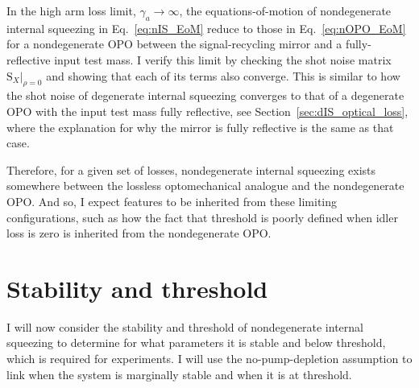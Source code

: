 
In the high arm loss limit, $\gamma_a\rightarrow\infty$, the equations-of-motion of nondegenerate internal squeezing in Eq.~\ref{eq:nIS_EoM} reduce to those in Eq.~\ref{eq:nOPO_EoM} for a nondegenerate OPO between the signal-recycling mirror and a fully-reflective input test mass.
I verify this limit by checking the shot noise matrix $\text{S}_X|_{\rho=0}$ and showing that each of its terms also converge. 
This is similar to how the shot noise of degenerate internal squeezing converges to that of a degenerate OPO with the input test mass fully reflective, see Section~\ref{sec:dIS_optical_loss}, where the explanation for why the mirror is fully reflective is the same as that case. 

Therefore, for a given set of losses, nondegenerate internal squeezing exists somewhere between the lossless optomechanical analogue and the nondegenerate OPO. And so, I expect features to be inherited from these limiting configurations, such as how the fact that threshold is poorly defined when idler loss is zero is inherited from the nondegenerate OPO.


\section{Stability and threshold}

I will now consider the stability and threshold of nondegenerate internal squeezing to determine for what parameters it is stable and below threshold, which is required for experiments. I will use the no-pump-depletion assumption to link when the system is marginally stable and when it is at threshold.

